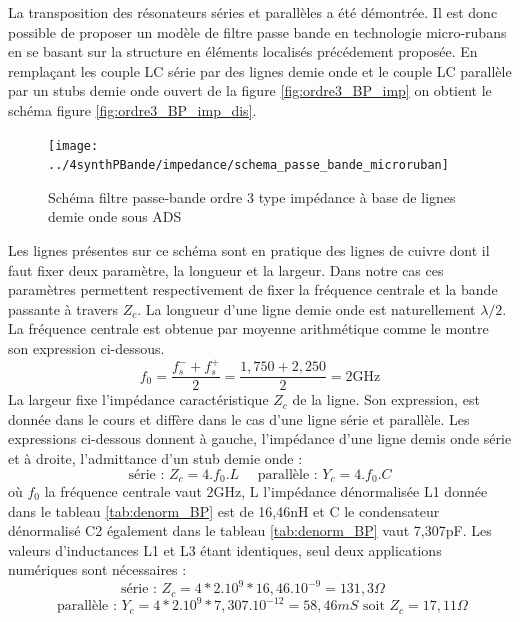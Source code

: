 \documentclass[french]{article}
\begin{document}
La transposition des résonateurs séries et parallèles a été démontrée. Il est donc possible de proposer un modèle de filtre passe bande en technologie micro-rubans en se basant sur la structure en éléments localisés précédement proposée. En remplaçant les couple LC série par des lignes demie onde et le couple LC parallèle par un stubs demie onde ouvert de la figure \ref{fig:ordre3_BP_imp} on obtient le schéma figure \ref{fig:ordre3_BP_imp_dis}.
\begin{figure}[H]
	\centering
	\texttt{[image: ../4synthPBande/impedance/schema\_passe\_bande\_microruban]}
	\caption{Schéma filtre passe-bande ordre 3 type impédance à base de lignes demie onde sous ADS}
	\label{fig:ads_sch_BP_localise}
\end{figure}
Les lignes présentes sur ce schéma sont en pratique des lignes de cuivre dont il faut fixer deux paramètre, la longueur et la largeur. Dans notre cas ces paramètres permettent respectivement de fixer la fréquence centrale et la bande passante à travers $Z_c$. La longueur d'une ligne demie onde est naturellement $\lambda /2$. La fréquence centrale est obtenue par moyenne arithmétique comme le montre son expression ci-dessous. 
\begin{equation}
f_0 = \frac{f_s^-+f_s^+}{2}=\frac{1,750+2,250}{2}=2\text{GHz}
\end{equation}
La largeur fixe l'impédance caractéristique $Z_c$ de la ligne. Son expression, est donnée dans le cours \cite{cours_HF} et diffère dans le cas d'une ligne série et parallèle. Les expressions ci-dessous donnent à gauche, l'impédance d'une ligne demis onde série et à droite, l'admittance d'un stub demie onde : 
\begin{equation}
	\text{série : } Z_c = 4.f_0.L \quad \text{ parallèle : } Y_c=4.f_0.C
\end{equation} 
où $f_0$ la fréquence centrale vaut $2\text{GHz}$, L l'impédance dénormalisée L1 donnée dans le tableau \ref{tab:denorm_BP} est de 16,46nH et C le condensateur dénormalisé C2 également dans le tableau \ref{tab:denorm_BP} vaut 7,307pF. Les valeurs d'inductances L1 et L3 étant identiques, seul deux applications numériques sont nécessaires :
\begin{equation}
\text{série : } Z_c = 4*2.10^{9}*16,46.10^{-9}=131,3\Omega \quad 
\end{equation}
\begin{equation}
\text{ parallèle : }
 Y_c=4*2.10^{9}*7,307.10^{-12} = 58,46mS \text{ soit } Z_c=17,11\Omega
\end{equation}
\end{document}
